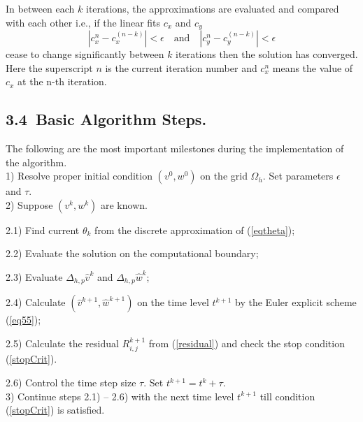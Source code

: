 \documentclass[leqno,11pt]{book}
\newcommand{\rf}[1]{(\ref{#1})}
\begin{document}
In between each $k$ iterations, the approximations are evaluated and compared with each other i.e., if the linear fits $c_{x}$ and $c_{y}$
\begin{equation}\label{stopCrit}
|c_{x}^{n} - c_{x}^{(n-k)}| < \epsilon \quad \textrm{and} \quad |c_{y}^{n} - c_{y}^{(n-k)}| < \epsilon
\end{equation}
cease to change significantly between $k$ iterations then the solution has converged. Here the superscript $n$ is the current iteration number and $c_{x}^{n}$ means the value of $c_{x}$ at the n-th iteration.

\subsection{3.4~Basic Algorithm Steps.}
The following are the most important milestones during the implementation of the algorithm.
\\
1) Resolve proper initial condition $(v^0, w^0)$ on the grid $\Omega_h$.  Set parameters $\epsilon$ and $\tau$.
\\
2) Suppose $(v^k, w^k)$ are known. 
\par
2.1) Find current $\theta_k$ from the discrete approximation of \rf{eqtheta};
\par
2.2) Evaluate the solution on the computational boundary;
\par
2.3) Evaluate $\Delta_{h,p}  \widehat{v}^k$ and $\Delta_{h,p}  \widehat{w}^k$;
\par
2.4) Calculate $(\widehat{v}^{k+1}, \widehat{w}^{k+1})$  on the  time level $t^{k+1}$ by the Euler explicit scheme   \rf{eq55};
\par
2.5) Calculate the residual $R^{k+1}_{i,j}$ from \rf{residual} and check the stop condition \rf{stopCrit}.
\par
2.6) Control the time step size $\tau$. Set $t^{k+1}=t^{k}+\tau$.
\\
3) Continue steps 2.1) -- 2.6) with the next time level $t^{k+1}$ till condition (\ref{stopCrit}) is satisfied.
\end{document}
